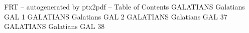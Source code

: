 \id FRT -- autogenerated by ptx2pdf --
\is Table of Contents
\tr {} GALATIANS Galatians GAL 1
\tr {} GALATIANS Galatians GAL 2
\tr {} GALATIANS Galatians GAL 37
\tr {} GALATIANS Galatians GAL 38
